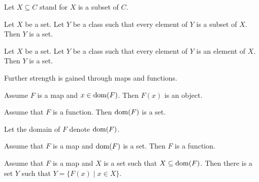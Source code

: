 \documentclass[english,11pt]{article}
\begin{document}
\begin{forthel}
Let $X \subseteq C$ stand for $X$ is a subset of $C$. 

\begin{axiom}[title = Powerset] Let $X$ be a set. Let $Y$ be a class such that
every element of $Y$ is a subset of $X$. Then $Y$ is a set.
\end{axiom}

\begin{axiom}[title = Separation]
Let $X$ be a set. Let $Y$ be a class such that every element
of $Y$ is an element of $X$.
Then $Y$ is a set.
\end{axiom}

\end{forthel}
Further strength is gained through maps and functions.

\begin{forthel}

\begin{proposition}
Assume $F$ is a map and $x \in \operatorname{dom}(F)$.
Then $F(x)$ is an object.
\end{proposition}

\begin{axiom}
Assume that $F$ is a function. Then $\operatorname{dom}(F)$ is a set.
\end{axiom}
Let the domain of $F$ denote $\operatorname{dom}(F)$.

\begin{axiom}
Assume that $F$ is a map and $\operatorname{dom}(F)$ is a set.
Then $F$ is a function.
\end{axiom}

\begin{axiom}[title = Replacement]
Assume that $F$ is a map and $X$ is a set such that $X \subseteq \operatorname{dom}(F)$.
Then there is a set $Y$ such that $Y = \{F(x) \mid x \in X\}$.
\end{axiom}

\end{forthel}
\end{document}
